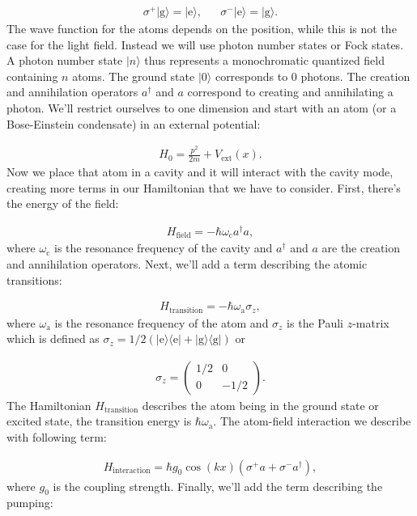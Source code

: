 \begin{align}
\sigma^+ |\text{g}\rangle = |\text{e}\rangle, && \sigma^- |\text{e}\rangle = |\text{g}\rangle.
\end{align}The wave function for the atoms depends on the position, while this is not the case for the light field. Instead we will use photon number states or Fock states. A photon number state $|n\rangle$ thus represents a monochromatic quantized field containing $n$ atoms. The ground state $|0\rangle$ corresponds to 0 photons. The creation and  annihilation operators $a^\dagger$ and $a$ correspond to creating and annihilating a photon. We'll restrict ourselves to one dimension and start with an atom (or a Bose-Einstein condensate) in an external potential:

\begin{align}
H_0 = \frac{p^2}{2m} + V_\text{ext}(x).
\end{align}Now we place that atom in a cavity and it will interact with the cavity mode, creating more terms in our Hamiltonian that we have to consider. First, there's the energy of the field:

\begin{align}
H_\text{field} = -\hbar \omega_\text{c} a^\dagger a,
\end{align}where $\omega_\text{c}$ is the resonance frequency of the cavity and $a^\dagger$ and $a$ are the creation and annihilation operators. Next, we'll add a term describing the atomic transitions:

\begin{align}
H_\text{transition} = -\hbar \omega_\text{a} \sigma_z,
\end{align}where $\omega_\text{a}$ is the resonance frequency of the atom and $\sigma_z$ is the Pauli $z$-matrix which is defined as $\sigma_z = 1/2(|\text{e}\rangle \langle \text{e}| + |\text{g} \rangle \langle \text{g}|)$ or

\begin{align}
\sigma_z = \begin{pmatrix}1/2 & 0 \\ 0 & -1/2\end{pmatrix}.
\end{align} The Hamiltonian $H_\text{transition}$ describes the atom being in the ground state or excited state, the transition energy is $\hbar \omega_\text{a}$. The atom-field interaction we describe with following term:

\begin{align}
H_\text{interaction} = \hbar g_0 \cos(kx) (\sigma^+ a + \sigma^- a^\dagger),
\end{align}where $g_0$ is the coupling strength. Finally, we'll add the term describing the pumping:

